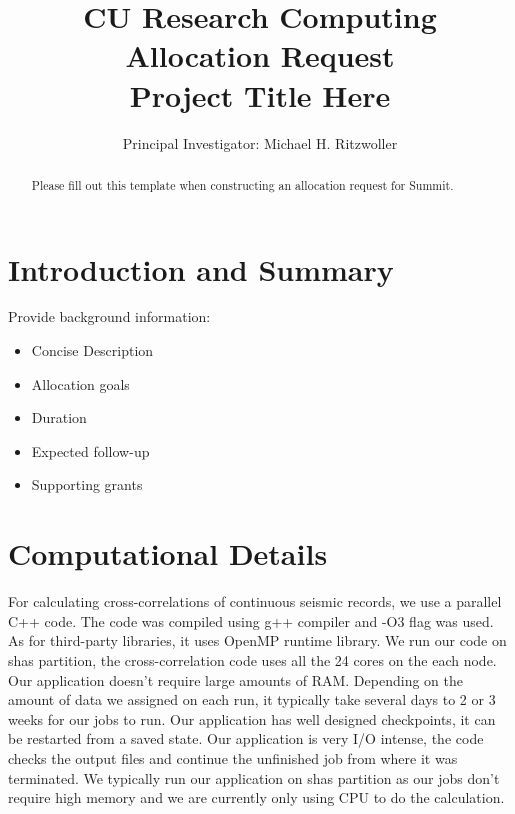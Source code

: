 
\title{%
\bf{CU Research Computing Allocation Request} \\
\Large Project Title Here
}

\author{Principal Investigator:  Michael H. Ritzwoller}

\date{}							%


\maketitle
\begin{abstract}
    Please fill out this template when constructing an allocation request for Summit.
\end{abstract}

\section{Introduction and Summary}

Provide background information:
\begin{itemize}
\item Concise Description
\item Allocation goals
\item Duration
\item Expected follow-up
\item Supporting grants
\end{itemize}


\section{Computational Details}

For calculating cross-correlations of continuous seismic records, we use a parallel C++ code. The code was compiled using g++ compiler and -O3 flag was used. As for third-party libraries, it uses OpenMP runtime library. We run our code on shas partition, the cross-correlation code uses all the 24 cores on the each node. Our application doesn't require large amounts of RAM. Depending on the amount of data we assigned on each run, it typically take several days to 2 or 3 weeks for our jobs to run. Our application has well designed checkpoints, it can be restarted from a saved state. Our application is very I/O intense, the code checks the output files and continue the unfinished job from where it was terminated. We typically run our application on shas partition as our jobs don't require high memory and we are currently only using CPU to do the calculation.

